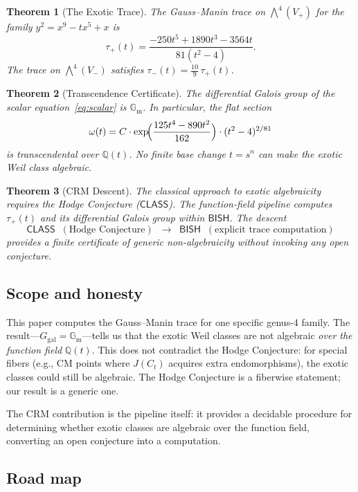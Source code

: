 \documentclass[11pt]{article}
\theoremstyle{plain}
\newtheorem{theorem}{Theorem}[section]
\theoremstyle{definition}
\theoremstyle{remark}
\newcommand{\Q}{\mathbb{Q}}
\newcommand{\Ggal}{G_{\mathrm{gal}}}
\newcommand{\Gm}{\mathbb{G}_{\mathrm{m}}}
\newcommand{\BISH}{\ensuremath{\mathsf{BISH}}}
\newcommand{\CLASS}{\ensuremath{\mathsf{CLASS}}}
\begin{document}
\begin{theorem}[The Exotic Trace]\label{thm:trace}
The Gauss--Manin trace on $\bigwedge^4(V_+)$ for the family
$y^2 = x^9 - tx^5 + x$ is
\[
\tau_+(t) = \frac{-250t^5 + 1890t^3 - 3564t}{81(t^2 - 4)}.
\]
The trace on $\bigwedge^4(V_-)$ satisfies $\tau_-(t) = \tfrac{10}{9}\,\tau_+(t)$.
\end{theorem}

\begin{theorem}[Transcendence Certificate]\label{thm:galois}
The differential Galois group of the scalar equation~\eqref{eq:scalar}
is $\Gm$. In particular, the flat section
\[
\omega(t) = C \cdot \exp\!\Bigl(\frac{125t^4 - 890t^2}{162}\Bigr)
\cdot (t^2 - 4)^{2/81}
\]
is transcendental over $\Q(t)$. No finite base change $t = s^n$ can
make the exotic Weil class algebraic.
\end{theorem}

\begin{theorem}[CRM Descent]\label{thm:squeeze}
The classical approach to exotic algebraicity requires the Hodge
Conjecture (\CLASS). The function-field pipeline computes $\tau_+(t)$
and its differential Galois group within \BISH. The descent
\[
\CLASS \;\;(\text{Hodge Conjecture}) \;\;\longrightarrow\;\;
\BISH \;\;(\text{explicit trace computation})
\]
provides a finite certificate of generic non-algebraicity without
invoking any open conjecture.
\end{theorem}

\subsection{Scope and honesty}

This paper computes the Gauss--Manin trace for one specific genus-4
family. The result---$\Ggal = \Gm$---tells us that the exotic Weil
classes are not algebraic \emph{over the function field} $\Q(t)$. This
does not contradict the Hodge Conjecture: for special fibers (e.g., CM
points where $J(C_t)$ acquires extra endomorphisms), the exotic classes
could still be algebraic. The Hodge Conjecture is a fiberwise statement;
our result is a generic one.

The CRM contribution is the pipeline itself: it provides a decidable
procedure for determining whether exotic classes are algebraic over the
function field, converting an open conjecture into a computation.

\subsection{Road map}
\end{document}
